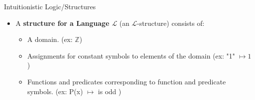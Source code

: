 \documentclass{beamer}
\begin{document}
\begin{frame}{Intuitionistic Logic/Structures}


    \begin{itemize}
        \item A \textbf{structure for a Language $\mathcal{L}$} (an $\mathcal{L}$-structure) consists of:
        \begin{itemize}
            \item A domain. (ex: $\mathbb{Z}$)
            \item Assignments for constant symbols to elements of the domain (ex: "1" $\mapsto 1$ )
            \item Functions and predicates corresponding to function and predicate symbols. (ex: P(x) $\mapsto$ is odd )

        \end{itemize}
    \end{itemize}
    
\end{frame}


\def\forcingExamplei{%
\begin{tikzpicture}
\node (equation) at (-2,1) {\scriptsize{does $\emptyset \vDash_{\mathcal{C}} \phi \lor \neg \phi$} ?};
\node (root) at (0,0) {\scriptsize{$\langle \{c_1\},\{ \} \rangle$ }};

\node (n1) at (0,-1) {\scriptsize{$\langle \{c_1\},\{\phi \} \rangle$ }};

\draw[-] (root) -- (n1);
\end{tikzpicture}
}

\def\forcingExampleiI{%
\begin{tikzpicture}
\node (equation) at (-2,1) {\scriptsize{does $\emptyset \vDash_{\mathcal{C}} \phi $} ?};
\node (root) at (0,0) {\scriptsize{$\langle \{c_1\},\{ \} \rangle$ }};

\node (n1) at (0,-1) {\scriptsize{$\langle \{c_1\},\{\phi \} \rangle$ }};

\draw[-] (root) -- (n1);
\end{tikzpicture}
}

\def\forcingExampleiII{%
\begin{tikzpicture}
\node (equation) at (-2,1) {\scriptsize{does $\emptyset \vDash_{\mathcal{C}} \neg \phi $} ?};
\node (root) at (0,0) {\scriptsize{$\langle \{c_1\},\{ \} \rangle$ }};

\node (n1) at (0,-1) {\scriptsize{$\langle \{c_1\},\{\phi \} \rangle$ }};

\draw[-] (root) -- (n1);
\end{tikzpicture}
}
\end{document}
